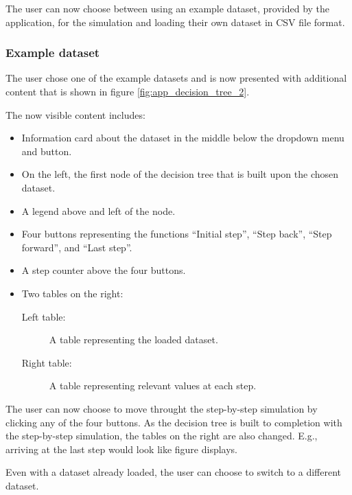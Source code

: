 The user can now choose between using an example dataset, provided by the application, for the simulation and loading their own dataset in CSV file format.

\subsubsection{Example dataset} \label{example_dataset}
The user chose one of the example datasets and is now presented with additional content that is shown in figure \ref{fig:app_decision_tree_2}.

The now visible content includes:
\begin{itemize}
    \item Information card about the dataset in the middle below the dropdown menu and button.
    \item On the left, the first node of the decision tree that is built upon the chosen dataset.
    \item A legend above and left of the node.
    \item Four buttons representing the functions ``Initial step'', ``Step back'', ``Step forward'', and ``Last step''.
    \item A step counter above the four buttons.
    \item Two tables on the right:
    \begin{description}
        \item[Left table:] A table representing the loaded dataset.
        \item[Right table:] A table representing relevant values at each step.
    \end{description}
\end{itemize}

The user can now choose to move throught the step-by-step simulation by clicking any of the four buttons. As the decision tree is built to completion with the step-by-step simulation, the tables on the right are also changed. E.g., arriving at the last step would look like figure  displays.

Even with a dataset already loaded, the user can choose to switch to a different dataset.

